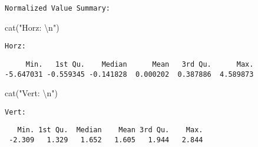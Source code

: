 \documentclass[
  letterpaper,
  DIV=11,
  numbers=noendperiod]{scrartcl}
\newenvironment{Shaded}{\begin{snugshade}}{\end{snugshade}}
\newcommand{\FunctionTok}[1]{\textcolor[rgb]{0.28,0.35,0.67}{#1}}
\newcommand{\NormalTok}[1]{\textcolor[rgb]{0.00,0.23,0.31}{#1}}
\newcommand{\SpecialCharTok}[1]{\textcolor[rgb]{0.37,0.37,0.37}{#1}}
\newcommand{\StringTok}[1]{\textcolor[rgb]{0.13,0.47,0.30}{#1}}
\begin{document}
\begin{verbatim}
Normalized Value Summary: 
\end{verbatim}

\begin{Shaded}
\begin{Highlighting}[]
\FunctionTok{cat}\NormalTok{(}\StringTok{"Horz: }\SpecialCharTok{\textbackslash{}n}\StringTok{"}\NormalTok{)}
\end{Highlighting}
\end{Shaded}

\begin{verbatim}
Horz: 
\end{verbatim}

\begin{Shaded}
\end{Shaded}

\begin{verbatim}
     Min.   1st Qu.    Median      Mean   3rd Qu.      Max. 
-5.647031 -0.559345 -0.141828  0.000202  0.387886  4.589873 
\end{verbatim}

\begin{Shaded}
\begin{Highlighting}[]
\FunctionTok{cat}\NormalTok{(}\StringTok{"Vert: }\SpecialCharTok{\textbackslash{}n}\StringTok{"}\NormalTok{)}
\end{Highlighting}
\end{Shaded}

\begin{verbatim}
Vert: 
\end{verbatim}

\begin{Shaded}
\end{Shaded}

\begin{verbatim}
   Min. 1st Qu.  Median    Mean 3rd Qu.    Max. 
 -2.309   1.329   1.652   1.605   1.944   2.844 
\end{verbatim}
\end{document}
